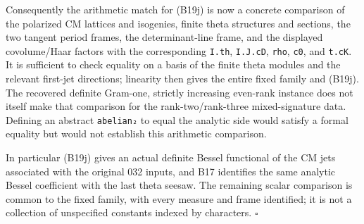 Consequently the arithmetic match for (B19j) is now a concrete
comparison of the polarized CM lattices and isogenies, finite
theta structures and sections, the two tangent period frames,
the determinant-line frame, and the displayed covolume/Haar
factors with the corresponding \texttt{I.th}, \texttt{I.J.cD},
\texttt{rho}, \texttt{c0}, and \texttt{t.cK}.  It is sufficient
to check equality on a basis of the finite theta modules and the
relevant first-jet directions; linearity then gives the entire
fixed family and (B19j).  The recovered definite Gram-one,
strictly increasing even-rank instance does not itself make that
comparison for the rank-two/rank-three mixed-signature data.
Defining an abstract \texttt{abelian₂} to equal the analytic side
would satisfy a formal equality but would not establish this
arithmetic comparison.

In particular (B19j) gives an actual definite Bessel functional
of the CM jets associated with the original 032 inputs, and B17
identifies the same analytic Bessel coefficient with the last
theta seesaw.  The remaining scalar comparison is common to
the fixed family, with every measure and frame identified; it is
not a collection of unspecified constants indexed by characters.
\hfill$\square$
